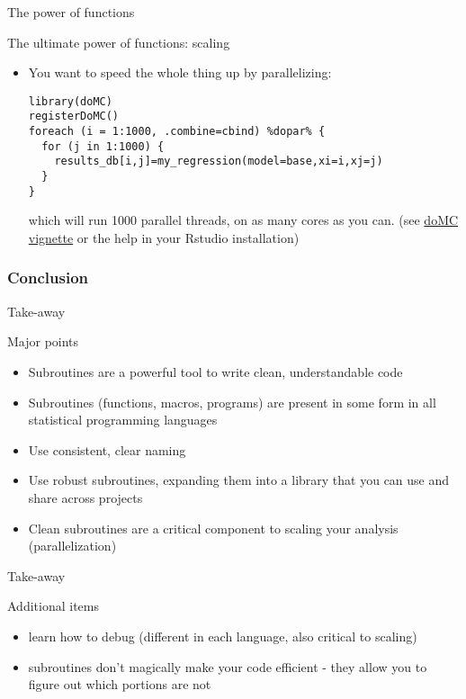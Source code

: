\documentclass[xcolor=table,compress]{beamer}
\begin{document}
\begin{frame}[fragile]{The power of functions}
\begin{block}{The ultimate power of functions: scaling}
\begin{itemize}
\item You want to speed the whole thing up by parallelizing:
\begin{lstlisting}
library(doMC)
registerDoMC()
foreach (i = 1:1000, .combine=cbind) %dopar% {
  for (j in 1:1000) {
  	results_db[i,j]=my_regression(model=base,xi=i,xj=j)
  }
}
\end{lstlisting}
which will run 1000 parallel threads, on as many cores as you can.
(see \href{http://cran.r-project.org/web/packages/doMC/vignettes/gettingstartedMC.pdf}{doMC vignette} or the help in your Rstudio installation)
\end{itemize}
\end{block}
\end{frame}


\subsubsection{Conclusion}

\begin{frame}{Take-away}
\begin{block}{Major points}
\begin{itemize}
\item Subroutines are a powerful tool to write clean, understandable code
\item Subroutines (functions, macros, programs) are present in some form in all statistical programming languages
\item Use consistent, clear naming
\item Use robust subroutines, expanding them into a library that you can use and share across projects
\item Clean subroutines are a critical component to scaling your analysis (parallelization)
\end{itemize}
\end{block}
\end{frame}


\begin{frame}{Take-away}
\begin{block}{Additional items}
\begin{itemize}
\item learn how to debug (different in each language, also critical to scaling)
\item subroutines don't magically make your code efficient - they allow you to figure out which portions are not
\end{itemize}
\end{block}
\end{frame}
\end{document}
